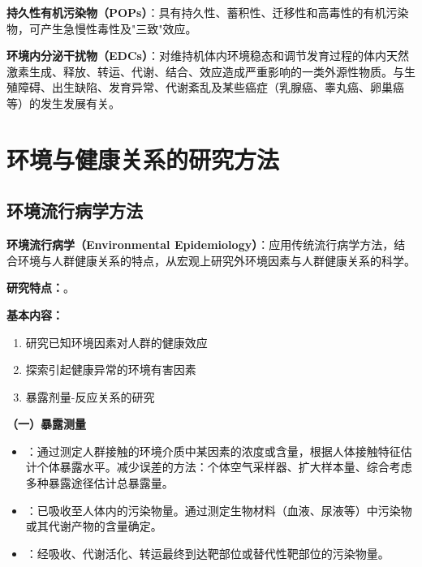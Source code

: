 \begin{defbox}
\textbf{持久性有机污染物（POPs）}：具有持久性、蓄积性、迁移性和高毒性的有机污染物，可产生急慢性毒性及"三致"效应。

\textbf{环境内分泌干扰物（EDCs）}：对维持机体内环境稳态和调节发育过程的体内天然激素生成、释放、转运、代谢、结合、效应造成严重影响的一类外源性物质。与生殖障碍、出生缺陷、发育异常、代谢紊乱及某些癌症（乳腺癌、睾丸癌、卵巢癌等）的发生发展有关。
\end{defbox}

\section{环境与健康关系的研究方法}

\subsection{环境流行病学方法}

\begin{keybox}
\textbf{环境流行病学（Environmental Epidemiology）}：应用传统流行病学方法，结合环境与人群健康关系的特点，从宏观上研究外环境因素与人群健康关系的科学。

\textbf{研究特点：}。

\textbf{基本内容：}
\begin{enumerate}[leftmargin=*]
    \item 研究已知环境因素对人群的健康效应
    \item 探索引起健康异常的环境有害因素
    \item 暴露剂量-反应关系的研究
\end{enumerate}
\end{keybox}

\textbf{（一）暴露测量}

\begin{itemize}[leftmargin=*]
    \item {}：通过测定人群接触的环境介质中某因素的浓度或含量，根据人体接触特征估计个体暴露水平。减少误差的方法：个体空气采样器、扩大样本量、综合考虑多种暴露途径估计总暴露量。
    \item {}：已吸收至人体内的污染物量。通过测定生物材料（血液、尿液等）中污染物或其代谢产物的含量确定。
    \item {}：经吸收、代谢活化、转运最终到达靶部位或替代性靶部位的污染物量。
\end{itemize}

